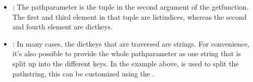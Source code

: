 \documentclass[a4paper,10pt,english]{sphinxmanual}
\begin{document}
\begin{sphinxVerbatim}[commandchars=\\\{\},numbers=left,firstnumber=1,stepnumber=1]
  \PYG{p}{[}  \PYG{p}{[}   \PYG{p}{]} \PYG{p}{[}  \PYG{p}{]}\PYG{p}{]}
    
 
\end{sphinxVerbatim}
\begin{itemize}
\item {}
\sphinxAtStartPar
{}: The path\sphinxhyphen{}parameter is the tuple in the second argument of the get\sphinxhyphen{}function. The first and third element in that tuple are list\sphinxhyphen{}indices, whereas the second and fourth element are dict\sphinxhyphen{}keys.

\item {}
\sphinxAtStartPar
{}: In many cases, the dict\sphinxhyphen{}keys that are traversed are strings. For convenience, it’s also possible to provide the whole path\sphinxhyphen{}parameter as one string that is split up into the different keys. In the example above,  is used to split the path\sphinxhyphen{}string, this can be customized using the {\hyperref[\detokenize{README:path_split}]{\emph{}}} {\hyperref[\detokenize{README:fagus-options}]{\emph{}}}.

\end{itemize}
\end{document}
